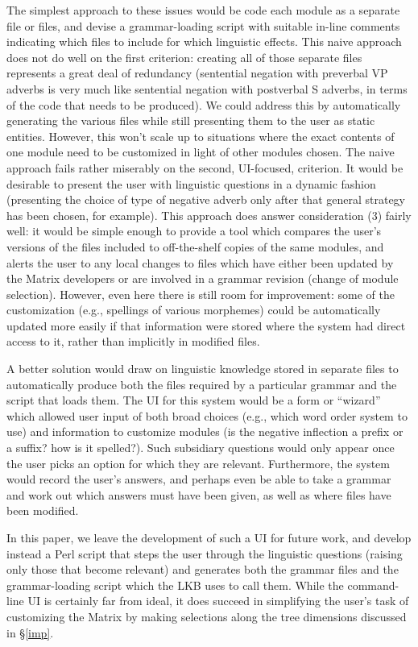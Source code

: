 \documentclass[11pt]{article}
\begin{document}
The simplest approach to these issues would be code each module as a
separate file or files, and devise a grammar-loading script with
suitable in-line comments indicating which files to include for which
linguistic effects.  This naive approach does not do well on the first
criterion: creating all of those separate files represents a great
deal of redundancy (sentential negation with preverbal VP adverbs is
very much like sentential negation with postverbal S adverbs, in terms
of the code that needs to be produced).  We could address this by
automatically generating the various files while still presenting them
to the user as static entities.  However, this won't scale up to
situations where the exact contents of one module need to be
customized in light of other modules chosen.  The naive approach fails
rather miserably on the second, UI-focused, criterion.  It would be
desirable to present the user with linguistic questions in a dynamic
fashion (presenting the choice of type of negative adverb only after
that general strategy has been chosen, for example).  This approach
does answer consideration (3) fairly well: it would be simple enough to
provide a tool which compares the user's versions of the files
included to off-the-shelf copies of the same modules, and alerts the
user to any local changes to files which have either been updated by
the Matrix developers or are involved in a grammar revision (change
of module selection).  However, even here there is still room for improvement:
some of the customization (e.g., spellings of various morphemes) could
be automatically updated more easily if that information were stored
where the system had direct access to it, rather than implicitly in
modified files.

A better solution would draw on linguistic knowledge stored in
separate files to automatically produce both the files required by a
particular grammar and the script that loads them.  The UI for this
system would be a form or ``wizard'' which allowed user input of both
broad choices (e.g., which word order system to use) and information
to customize modules (is the negative inflection a prefix or a suffix?
how is it spelled?).  Such subsidiary questions would only appear once
the user picks an option for which they are relevant. Furthermore, the
system would record the user's answers, and perhaps even be able to
take a grammar and work out which answers must have been given, as
well as where files have been modified.

In this paper, we leave the development of such a UI for future work,
and develop instead a Perl script that steps the
user through the linguistic questions (raising only those that become
relevant) and generates both the grammar files and the grammar-loading
script which the LKB uses to call them.  While the command-line UI is
certainly far from ideal, it does succeed in simplifying the user's task
of customizing the Matrix by making selections along the tree dimensions
discussed in \S\ref{imp}.
\end{document}
